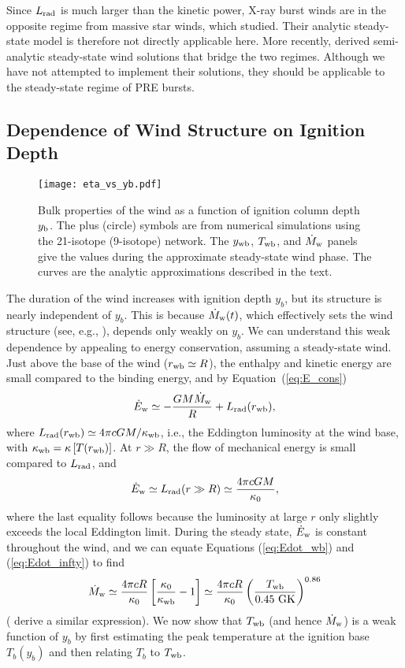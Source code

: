 \documentclass[apj,usenatbib, iop, twocolappendix]{emulateapj}
\newcommand{\Lrad}{L_{\rm rad}}
\newcommand{\Mdot}{\dot{M}_{\rm w}}
\newcommand{\Edot}{\dot{E}_{\rm w}}
\newcommand{\beq}{\begin{equation}}
\newcommand{\eeq}{\end{equation}}
\newcommand{\trm}[1]{\textrm{#1}}
\begin{document}
Since $\Lrad$ is much larger than the kinetic power,  X-ray burst winds are in the opposite regime from massive star winds, which \citet{Quataert:16} studied.  Their analytic steady-state model is therefore not directly applicable here. More recently, \citet{Owocki:17} derived semi-analytic steady-state wind solutions that bridge the two regimes.   Although we have not attempted to implement their solutions, they should be applicable to the steady-state regime of PRE  bursts.

\subsection{Dependence of Wind Structure on Ignition Depth}
\label{sec:wind_vs_yb}

\begin{figure}
\texttt{[image: eta\_vs\_yb.pdf]}
\caption{
Bulk properties of the wind as a function of ignition column depth $y_{\rm b}$. The plus (circle) symbols are from numerical simulations using the 21-isotope (9-isotope) network. The $y_{\rm wb}$, $T_{\rm wb}$, and $\Mdot$ panels give the values during the approximate steady-state wind phase. The curves are the analytic approximations described in the text.}
\label{fig:eta_vs_yb}
\end{figure}

The duration of the wind increases with ignition depth $y_b$, but its structure is nearly independent of $y_b$.  This is because  $\dot{M}_{\rm w}(t)$, which effectively sets the wind structure (see, e.g., \citealt{Kato:83, Paczynski:86}), depends only weakly on $y_b$. We can understand this weak dependence by appealing to energy conservation, assuming a steady-state wind.  Just above the base of the wind ($r_{\rm wb}\simeq R$), the enthalpy and kinetic energy are small compared to the binding energy,  and by Equation~(\ref{eq:E_cons}) 
\begin{equation}
\Edot \simeq -\frac{GM \Mdot}{R} + \Lrad(r_{\rm wb}),
\label{eq:Edot_wb}
\end{equation} 
where $\Lrad(r_{\rm wb})\simeq 4\pi c G M/\kappa_{\rm wb}$, i.e., the  Eddington luminosity at the wind base, with $\kappa_{\rm wb}=\kappa\left[T(r_{\rm wb})\right]$.  At $r\gg R$, the flow of mechanical energy is small compared to $L_{\rm rad}$, and 
\beq
\Edot\simeq L_{\rm rad}(r\gg R) \simeq \frac{4\pi c GM}{\kappa_0},
\label{eq:Edot_infty}
\eeq
where the last equality follows because the luminosity at large $r$ only slightly exceeds the local Eddington limit. During the steady state, $\Edot$ is constant throughout the wind, and we can equate Equations (\ref{eq:Edot_wb}) and (\ref{eq:Edot_infty}) to find
\beq
\Mdot \simeq \frac{4\pi c R}{\kappa_0}\left[\frac{\kappa_0}{\kappa_{\rm wb}}-1\right]\simeq  \frac{4\pi c R}{\kappa_0}\left(\frac{T_{\rm wb}}{0.45\trm{ GK}}\right)^{0.86}
\label{eq:Mdot_Twb}
\eeq
(\citealt{Paczynski:86} derive a similar expression). We now show that $T_{\rm wb}$ (and hence $\Mdot$) is a weak function of $y_b$ by first estimating the peak temperature at the ignition base $T_b(y_b)$ and then relating $T_b$ to $T_{\rm wb}$.
\end{document}
